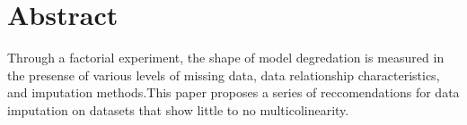 \documentclass[../paper.tex]{subfiles}
\begin{document}
\section{Abstract}

Through a factorial experiment, the shape of model degredation is measured
in the presense of various levels of missing data, data relationship
characteristics, and imputation methods.This paper proposes a series of
reccomendations for data imputation on datasets that show little to no multicolinearity.
\end{document}
